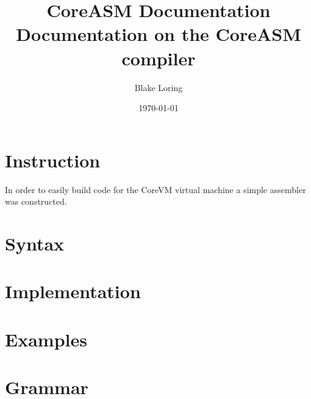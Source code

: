 \documentclass{report}
\title{CoreASM Documentation \\ \large Documentation on the CoreASM compiler}
\author{Blake Loring}
\date{\today}
\begin{document}
\maketitle

\section* {Instruction}
In order to easily build code for the CoreVM virtual machine a simple assembler was constructed.
\section* {Syntax}
\section* {Implementation}
\section* {Examples}
\section* {Grammar}
\end{document}

